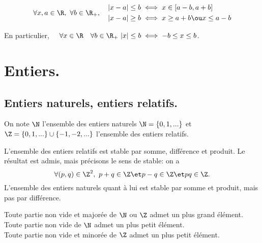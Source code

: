 \documentclass[11pt]{article}
\begin{document}
\begin{prop}{}{}
    \begin{equation*}
        \forall x,a\in\R,~\forall b\in\R_+,\quad\begin{aligned}
            |x-a|\leq b &\iff x\in[a-b,a+b]\\
            |x-a|\geq b &\iff x\geq a+b \ou x\leq a-b
        \end{aligned}
    \end{equation*}
    \begin{center}
        En particulier, $\quad\forall x\in \R\quad\forall b\in\R_+~|x|\leq b\iff -b\leq x \leq b$.
    \end{center}
\end{prop}

\section{Entiers.}

\subsection{Entiers naturels, entiers relatifs.}

\begin{defi}{}{}
    On note $\N$ l'ensemble des entiers naturels $\N=\{0,1,...\}$ et $\Z=\{0,1,...\}\cup\{-1,-2,...\}$ l'ensemble des entiers relatifs.
\end{defi}

\begin{prop}{}{}
    L'ensemble des entiers relatifs est stable par somme, différence et produit.
    \tcblower
    Le résultat est admis, mais précisons le sens de stable: on a
    \begin{equation*}
        \forall (p,q)\in\Z^2,~p+q\in\Z\et p-q\in\Z\et pq\in\Z.
    \end{equation*}
    L'ensemble des entiers naturels quant à lui est stable par somme et produit, mais pas par différence.
\end{prop}

\begin{prop}{}{}
    Toute partie non vide et majorée de $\N$ ou $\Z$ admet un plus grand élément.\\
    Toute partie non vide de $\N$ admet un plus petit élément.\\
    Toute partie non vide et minorée de $\Z$ admet un plus petit élément.
\end{prop}
\end{document}
